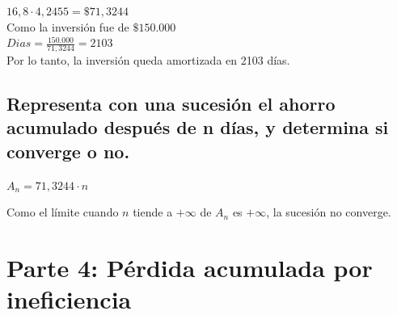 \documentclass[11pt, a4paper]{article}
\begin{document}
$16,8 \cdot 4,2455 = \$71,3244$ \\

Como la inversión fue de $\$150.000$ \\

$Dias = \frac{150.000}{71,3244} = 2103$ \\

Por lo tanto, la inversión queda amortizada en 2103 días.

\subsection{Representa con una sucesión el ahorro acumulado después de n días, y determina si converge o no.}

$A_n = 71,3244 \cdot n$

Como el límite cuando $n$ tiende a $+\infty$ de $A_n$ es $+\infty$, la sucesión no converge.

\section{Parte 4: Pérdida acumulada por ineficiencia}
\end{document}
